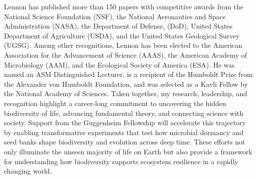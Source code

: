 \documentclass[11pt]{article}
\begin{document}
Lennon has published more than 150 papers with competitive awards from the National Science Foundation (NSF), the National Aeronautics and Space Administration (NASA), the Department of Defense, (DoD), United States Department of Agriculture (USDA), and the United States Geological Survey (UGSG). Among other recognitions, Lennon has been elected to the American Association for the Advancement of Science (AAAS), the American Academy of Microbiology (AAM), and the Ecological Society of America (ESA). He was named an ASM Distinguished Lecturer, is a recipient of the Humboldt Prize from the Alexander von Humboldt Foundation, and was selected as a Kavli Fellow by the National Academy of Sciences. Taken together, my research, leadership, and recognition highlight a career-long commitment to uncovering the hidden biodiversity of life, advancing fundamental theory, and connecting science with society. Support from the Guggenheim Fellowship will accelerate this trajectory by enabling transformative experiments that test how microbial dormancy and seed banks shape biodiversity and evolution across deep time. These efforts not only illuminate the unseen majority of life on Earth but also provide a framework for understanding how biodiversity supports ecosystem resilience in a rapidly changing world.
\end{document}
